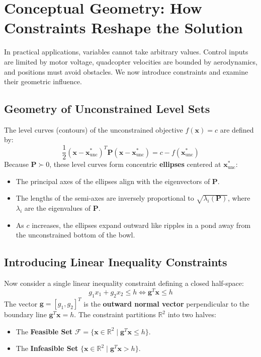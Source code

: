 \documentclass[11pt,a4paper]{article}
\begin{document}
\section{Conceptual Geometry: How Constraints Reshape the Solution}

In practical applications, variables cannot take arbitrary values. Control inputs are limited by motor voltage, quadcopter velocities are bounded by aerodynamics, and positions must avoid obstacles. We now introduce constraints and examine their geometric influence.

\subsection{Geometry of Unconstrained Level Sets}
The level curves (contours) of the unconstrained objective $f(\mathbf{x}) = c$ are defined by:
\begin{equation}
\frac{1}{2} (\mathbf{x} - \mathbf{x}^*_{\mathrm{unc}})^T \mathbf{P} (\mathbf{x} - \mathbf{x}^*_{\mathrm{unc}}) = c - f(\mathbf{x}^*_{\mathrm{unc}})
\label{eq:ellipsoids}
\end{equation}
Because $\mathbf{P} \succ 0$, these level curves form concentric \textbf{ellipses} centered at $\mathbf{x}^*_{\mathrm{unc}}$:
\begin{itemize}
    \item The principal axes of the ellipses align with the eigenvectors of $\mathbf{P}$.
    \item The lengths of the semi-axes are inversely proportional to $\sqrt{\lambda_i(\mathbf{P})}$, where $\lambda_i$ are the eigenvalues of $\mathbf{P}$.
    \item As $c$ increases, the ellipses expand outward like ripples in a pond away from the unconstrained bottom of the bowl.
\end{itemize}

\subsection{Introducing Linear Inequality Constraints}
Now consider a single linear inequality constraint defining a closed half-space:
\begin{equation}
g_1 x_1 + g_2 x_2 \le h \iff \mathbf{g}^T \mathbf{x} \le h
\label{eq:ineq_constraint}
\end{equation}
The vector $\mathbf{g} = [g_1, g_2]^T$ is the \textbf{outward normal vector} perpendicular to the boundary line $\mathbf{g}^T \mathbf{x} = h$. The constraint partitions $\mathbb{R}^2$ into two halves:
\begin{itemize}
    \item The \textbf{Feasible Set} $\mathcal{F} = \{\mathbf{x} \in \mathbb{R}^2 \mid \mathbf{g}^T \mathbf{x} \le h\}$.
    \item The \textbf{Infeasible Set} $\{\mathbf{x} \in \mathbb{R}^2 \mid \mathbf{g}^T \mathbf{x} > h\}$.
\end{itemize}
\end{document}
